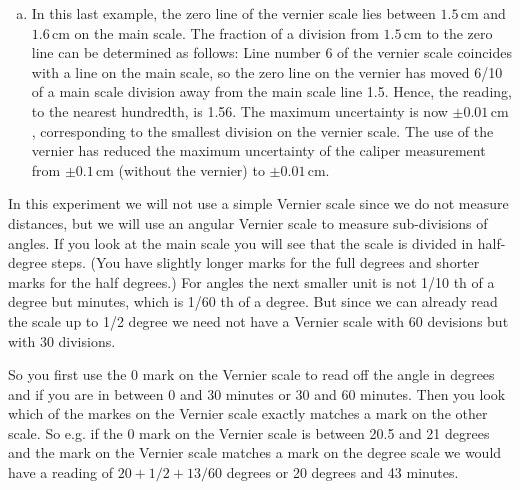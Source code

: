 \begin{enumerate}[a)]
\item In this last example, the zero line of the vernier scale lies between $1.5\,\mathrm{cm}$ and $1.6\,\mathrm{cm}$ on the main scale. The fraction of a division from $1.5\,\mathrm{cm}$ to the zero line can be determined as follows: Line number 6 of the vernier scale coincides with a line on the main scale, so the zero line on the vernier has moved 6/10 of a main scale division away from the main scale line 1.5. Hence, the reading, to the nearest hundredth, is 1.56. The maximum uncertainty is now $\pm 0.01\,\mathrm{cm}$, corresponding to the smallest division on the vernier scale. The use of the vernier has reduced the maximum uncertainty of the caliper measurement from $\pm 0.1\,\mathrm{cm}$ (without the vernier) to $\pm 0.01\,\mathrm{cm}$.
\end{enumerate}

In this experiment we will not use a simple Vernier scale since we do not measure distances, but we will use an angular Vernier scale to measure sub-divisions of angles. If you look at the main scale you will see that the scale is divided in half-degree steps. (You have slightly longer marks for the full degrees and shorter marks for the half degrees.) For angles the next smaller unit is not 1/10 th of a degree but minutes, which is 1/60 th of a degree. But since we can already read the scale up to 1/2 degree we need not have a Vernier scale with 60 devisions but with 30 divisions.\myskip

So you first use the 0 mark on the Vernier scale to read off the angle in degrees and if you are in between 0 and 30 minutes or 30 and 60 minutes. Then you look which of the
markes on the Vernier scale exactly matches a mark on the other scale. So e.g. if the 0 mark on the Vernier scale is between 20.5 and 21 degrees and the  mark on the
Vernier scale matches a mark on the degree scale we would have a reading of $20 + 1/2+ 13/60$ degrees or 20 degrees and 43 minutes.

